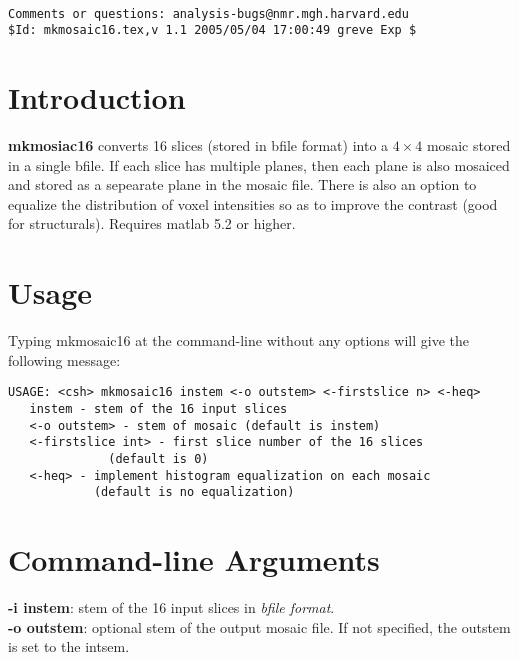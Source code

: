 \documentclass[10pt]{article}
\begin{document}
\begin{Large}
 \\
\end{Large}

\noindent 
\begin{verbatim}
Comments or questions: analysis-bugs@nmr.mgh.harvard.edu
$Id: mkmosaic16.tex,v 1.1 2005/05/04 17:00:49 greve Exp $
\end{verbatim}

\section{Introduction}
{\bf mkmosiac16} converts 16 slices (stored in bfile format) into a $4
\times 4$ mosaic stored in a single bfile.  If each slice has multiple
planes, then each plane is also mosaiced and stored as a sepearate
plane in the mosaic file.  There is also an option to equalize the
distribution of voxel intensities so as to improve the contrast (good
for structurals). Requires matlab 5.2 or higher.\\

\section{Usage}
Typing mkmosaic16 at the command-line without any options will give the
following message:\\ 

\begin{small}
\begin{verbatim}
USAGE: <csh> mkmosaic16 instem <-o outstem> <-firstslice n> <-heq>
   instem - stem of the 16 input slices
   <-o outstem> - stem of mosaic (default is instem)
   <-firstslice int> - first slice number of the 16 slices 
              (default is 0)
   <-heq> - implement histogram equalization on each mosaic
            (default is no equalization)
\end{verbatim}
\end{small}

\section{Command-line Arguments}

\noindent
{\bf -i instem}: stem of the 16 input slices in {\em bfile format}. \\ 

\noindent
{\bf -o outstem}: optional stem of the output mosaic file.  If not
specified, the outstem is set to the intsem.\\
\end{document}
